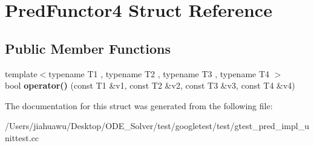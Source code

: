 \hypertarget{struct_pred_functor4}{}\section{Pred\+Functor4 Struct Reference}
\label{struct_pred_functor4}
\subsection*{Public Member Functions}
\begin{DoxyCompactItemize}
\item 
\mbox{\label{struct_pred_functor4_a6cfb6ccd9a66bf93d9c43a49575e3869}} 
{\footnotesize template$<$typename T1 , typename T2 , typename T3 , typename T4 $>$ }\\bool {\bfseries operator()} (const T1 \&v1, const T2 \&v2, const T3 \&v3, const T4 \&v4)
\end{DoxyCompactItemize}


The documentation for this struct was generated from the following file\+:\begin{DoxyCompactItemize}
\item 
/\+Users/jiahuawu/\+Desktop/\+O\+D\+E\+\_\+\+Solver/test/googletest/test/gtest\+\_\+pred\+\_\+impl\+\_\+unittest.\+cc\end{DoxyCompactItemize}
